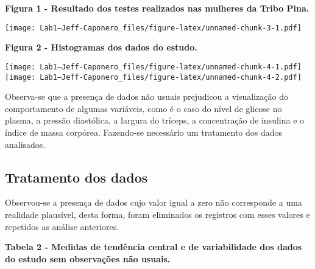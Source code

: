 \documentclass[
]{article}
\begin{document}
\newpage

\textbf{Figura 1 - Resultado dos testes realizados nas mulheres da Tribo
Pina.}

\newline
\newline

\texttt{[image: Lab1---Jeff-Caponero\_files/figure-latex/unnamed-chunk-3-1.pdf]}
\newline \newline \newline

\textbf{Figura 2 - Histogramas dos dados do estudo.}

\texttt{[image: Lab1---Jeff-Caponero\_files/figure-latex/unnamed-chunk-4-1.pdf]}
\texttt{[image: Lab1---Jeff-Caponero\_files/figure-latex/unnamed-chunk-4-2.pdf]}

\newline
\newline
\newline
\newline

Observa-se que a presença de dados não usuais prejudicou a visualização
do comportamento de algumas variáveis, como é o caso do nível de glicose
no plasma, a pressão diastólica, a largura do tríceps, a concentração de
insulina e o índice de massa corpórea. Fazendo-se necessário um
tratamento dos dados analisados.

\newline
\newline

\hypertarget{tratamento-dos-dados}{%
\subsection{Tratamento dos dados}\label{tratamento-dos-dados}}

\newline
\newline

Observou-se a presença de dados cujo valor igual a zero não corresponde
a uma realidade plausível, desta forma, foram eliminados os registros
com esses valores e repetidos as análise anteriores.

\newline

\textbf{Tabela 2 - Medidas de tendência central e de variabilidade dos
dados do estudo sem observações não usuais.}
\end{document}
